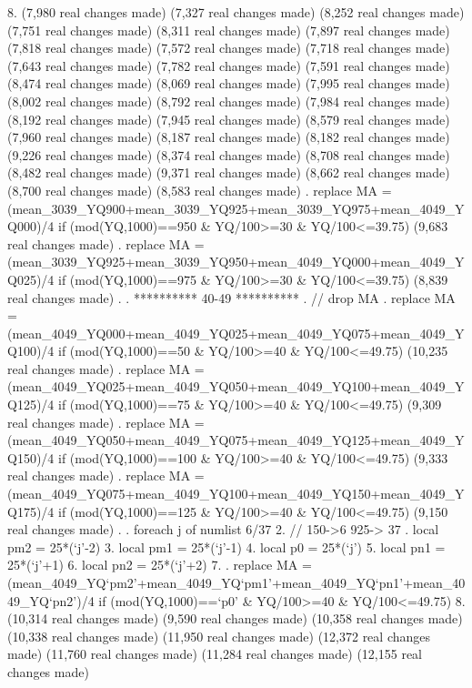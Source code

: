   8. {\rbr}
(7,980 real changes made)
(7,327 real changes made)
(8,252 real changes made)
(7,751 real changes made)
(8,311 real changes made)
(7,897 real changes made)
(7,818 real changes made)
(7,572 real changes made)
(7,718 real changes made)
(7,643 real changes made)
(7,782 real changes made)
(7,591 real changes made)
(8,474 real changes made)
(8,069 real changes made)
(7,995 real changes made)
(8,002 real changes made)
(8,792 real changes made)
(7,984 real changes made)
(8,192 real changes made)
(7,945 real changes made)
(8,579 real changes made)
(7,960 real changes made)
(8,187 real changes made)
(8,182 real changes made)
(9,226 real changes made)
(8,374 real changes made)
(8,708 real changes made)
(8,482 real changes made)
(9,371 real changes made)
(8,662 real changes made)
(8,700 real changes made)
(8,583 real changes made)
{\smallskip}
. replace MA = (mean_3039_YQ900+mean_3039_YQ925+mean_3039_YQ975+mean_4049_YQ000)/4 if (mod(YQ,1000)==950 \& YQ/100>=30 \& YQ/100<=39.75)
(9,683 real changes made)
{\smallskip}
. replace MA = (mean_3039_YQ925+mean_3039_YQ950+mean_4049_YQ000+mean_4049_YQ025)/4 if (mod(YQ,1000)==975 \& YQ/100>=30 \& YQ/100<=39.75)
(8,839 real changes made)
{\smallskip}
. 
. **********  40-49 **********
. // drop MA
. replace MA = (mean_4049_YQ000+mean_4049_YQ025+mean_4049_YQ075+mean_4049_YQ100)/4 if (mod(YQ,1000)==50 \& YQ/100>=40 \& YQ/100<=49.75)
(10,235 real changes made)
{\smallskip}
. replace MA = (mean_4049_YQ025+mean_4049_YQ050+mean_4049_YQ100+mean_4049_YQ125)/4 if (mod(YQ,1000)==75 \& YQ/100>=40 \& YQ/100<=49.75)
(9,309 real changes made)
{\smallskip}
. replace MA = (mean_4049_YQ050+mean_4049_YQ075+mean_4049_YQ125+mean_4049_YQ150)/4 if (mod(YQ,1000)==100 \& YQ/100>=40 \& YQ/100<=49.75)
(9,333 real changes made)
{\smallskip}
. replace MA = (mean_4049_YQ075+mean_4049_YQ100+mean_4049_YQ150+mean_4049_YQ175)/4 if (mod(YQ,1000)==125 \& YQ/100>=40 \& YQ/100<=49.75)
(9,150 real changes made)
{\smallskip}
. 
. foreach j of numlist 6/37{\lbr}
  2.         // 150->6 925-> 37
.         local pm2 = 25*(`j'-2)
  3.         local pm1 = 25*(`j'-1)
  4.         local p0 = 25*(`j')
  5.         local pn1 = 25*(`j'+1)
  6.         local pn2 = 25*(`j'+2)
  7. 
.         replace MA = (mean_4049_YQ`pm2'+mean_4049_YQ`pm1'+mean_4049_YQ`pn1'+mean_4049_YQ`pn2')/4 if (mod(YQ,1000)==`p0' \& YQ/100>=40 \& YQ/100<=49.75)
  8. {\rbr}
(10,314 real changes made)
(9,590 real changes made)
(10,358 real changes made)
(10,338 real changes made)
(11,950 real changes made)
(12,372 real changes made)
(11,760 real changes made)
(11,284 real changes made)
(12,155 real changes made)
